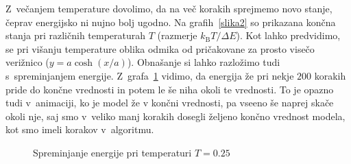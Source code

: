 \documentclass[a4paper,pdftex,10pt]{article}
\numberwithin{figure}{section} %
\begin{document}
Z~večanjem temperature dovolimo, da na več korakih sprejmemo novo stanje, čeprav energijsko
ni nujno bolj ugodno. Na grafih~\ref{slika2} so prikazana končna stanja pri različnih 
temperaturah $T$ (razmerje $k_{\text{B}} T/\Delta E$). Kot lahko predvidimo, se pri višanju 
temperature oblika odmika od pričakovane za prosto visečo verižnico ($y = a \cosh (x/a)$). 
Obnašanje si lahko razložimo tudi s~spreminjanjem energije. Z~grafa~\ref{slika4} vidimo,
da energija že pri nekje $200$ korakih pride do končne vrednosti in potem le še niha
okoli te vrednosti. To je opazno tudi v~animaciji, ko je model že v končni vrednosti,
pa vseeno še naprej skače okoli nje, saj smo v~veliko manj korakih dosegli željeno končno
vrednost modela, kot smo imeli korakov v~algoritmu.
\begin{figure}    
    \begin{minipage}{0.6\linewidth}
	\centering 
	\resizebox{\linewidth}{!}{} 
    \end{minipage}
    \begin{minipage}{0.6\linewidth}
	\centering 
	\resizebox{\linewidth}{!}{} 
    \end{minipage}
    \caption{Spreminjanje energije pri temperaturi $T=0.25$} 
    \label{slika4}
\end{figure}


\pagebreak
\end{document}
